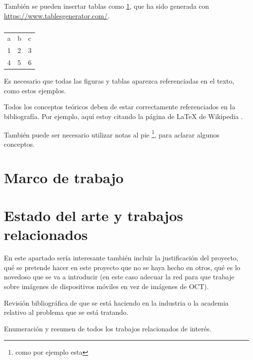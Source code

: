 También se pueden insertar tablas como \ref{tab:my-table}, que ha sido generada con \url{https://www.tablesgenerator.com/}.

\begin{table}[]
\begin{tabular}{lll}
a & b & c \\
1 & 2 & 3 \\
4 & 5 & 6
\end{tabular}
\caption{}
\label{tab:my-table}
\end{table}

Es necesario que todas las figuras y tablas aparezca referenciadas en el texto, como estos ejemplos.

Todos los conceptos teóricos deben de estar correctamente referenciados en la bibliografía. Por ejemplo, aquí estoy citando la página de \LaTeX{} de Wikipedia \cite{wiki:latex}.

También puede ser necesario utilizar notas al pie \footnote{como por ejemplo esta}, para aclarar algunos conceptos.

\section{Marco de trabajo}

\section{Estado del arte y trabajos relacionados}

En este apartado sería interesante también incluir la justificación del proyecto, qué se pretende hacer en este proyecto que no se haya hecho en otros, qué es lo novedoso que se va a introducir (en este caso adecuar la red para que trabaje sobre imágenes de dispositivos móviles en vez de imágenes de OCT).

Revisión bibliográfica de que se está haciendo en la industria o la academia relativo al problema que se está tratando.

Enumeración y resumen de todos los trabajos relacionados de interés.

